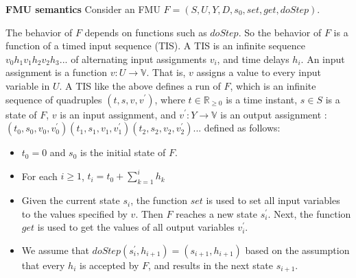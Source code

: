 \begin{definition}
\textbf{FMU semantics}
Consider an FMU $F=(S,U,Y,D,s_{0},set,get,doStep)$.
\end{definition} 
The behavior of $F$ depends on functions such as $doStep$. So the behavior of $F$ is a function of a timed input sequence (TIS). A TIS is an infinite sequence 
$v_{0}h_{1}v_{1}h_{2}v_{2}h_{3}...$
of alternating input assignments $v_{i}$, and time delays $h_{i}$. An input assignment is a function $v : U \rightarrow \mathbb{V}$. That is, $v$ assigns a value to every input variable in $U$.
A TIS like the above defines a run of $F$, which is an infinite sequence of quadruples $(t,s,v,v^{\prime})$, where $t \in \mathbb{R}_{\geqslant{0}}$ is a time instant, $s \in S$ is a state of $F$, $v$ is an input assignment, and $v^{\prime} : Y \rightarrow \mathbb{V}$ is an output assignment :
$(t_{0},s_{0},v_{0},v_{0}^{\prime})(t_{1},s_{1},v_{1},v_{1}^{\prime})(t_{2},s_{2},v_{2},v_{2}^{\prime})...$
defined as follows:
\begin{itemize}
\item
$t_{0} = 0$ and $s_{0}$ is the initial state of $F$.
\item
For each $i \geqslant 1$, $t_{i} = t_{0} + \sum_{k = 1}^i h_{k}$
\item
Given the current state $s_{i}$, the function $set$ is used to set all input variables to the values specified by $v$. Then $F$ reaches a new state $s_{i}^{\prime}$. Next, the function $get$ is used to get the values of all output variables $v_{i}^{\prime}$.
\item 
We assume that $doStep(s_{i}^{\prime}, h_{i+1}) = (s_{i+1},h_{i+1})$ based on the assumption that every $h_{i}$ is accepted by $F$, and results in the next state $s_{i+1}$.
\end{itemize}
